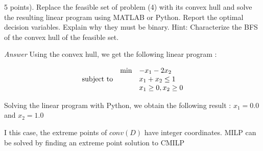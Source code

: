 \documentclass[10pt]{article}
\newenvironment{exercise}[2][Exercise]{\begin{trivlist}
  \item[\hskip \labelsep {\bfseries #1}\hskip \labelsep {\bfseries #2.}]}{\end{trivlist}}
\begin{document}
\begin{exercise}{4}
(5 points). Replace the feasible set of problem (4) with its convex hull and solve the resulting linear program using MATLAB or Python. Report the optimal decision variables. Explain why they must be binary. Hint:
Characterize the BFS of the convex hull of the feasible set.


\textit{Answer}
Using the convex hull, we get the following linear program : 


\begin{equation*}
\begin{array}{lll@{}lll}
&\text{min}  & - x_1 - 2 x_2  &\\
\text{subject to} 
&& x_1 + x_2 \leq 1 \\
&&  x_1  \geq 0,  x_2 \geq 0 \\
          
\end{array}
\end{equation*}

Solving the linear program with Python, we obtain  the following result : $x_1 =  0.0$ and $x_2 = 1.0$

I this case, the extreme points of $conv(D)$ have integer coordinates. MILP can be solved by finding an extreme point solution to CMILP

\end{exercise}
  
  
\end{document}
